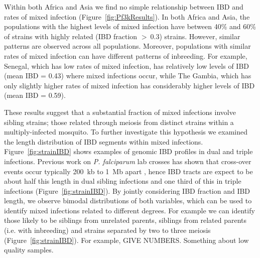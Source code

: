 \documentclass[9pt,lineno]{elife}
\begin{document}
Within both Africa and Asia we find no simple relationship between IBD and rates of mixed infection (Figure~\ref{fig:Pf3kResults}).  In both Africa and Asia, the populations with the highest levels of mixed infection have between 40\% and 60\% of strains with highly related (IBD fraction $>~0.3$) strains.  However, similar patterns are observed across all populations.  Moreover, populations with similar rates of mixed infection can have different patterns of inbreeding.  For example, Senegal, which has low rates of mixed infection, has relatively low levels of IBD (mean IBD = 0.43) where mixed infections occur, while The Gambia, which has only slightly higher rates of mixed infection has considerably higher levels of IBD (mean IBD = 0.59).

These results suggest that a substantial fraction of mixed infections involve sibling strains; those related through meiosis from distinct strains within a multiply-infected mosquito.  To further investigate this hypothesis we examined the length distribution of IBD segments within mixed infections.  Figure~\ref{fig:strainIBD} shows examples of genomic IBD profiles in dual and triple infections.  Previous work on {\it P. falciparum} lab crosses has shown that cross-over events occur typically 200~kb to 1~Mb apart \citet{Miles2016}, hence IBD tracts are expect to be about half this length in dual sibling infections and one third of this in triple infections (Figure~\ref{fig:strainIBD}).  By jointly considering IBD fraction and IBD length, we observe bimodal distributions of both variables, which can be used to identify mixed infections related to different degrees.  For example we can identify those likely to be siblings from unrelated parents, siblings from related parents (i.e. with inbreeding) and strains separated by two to three meiosis (Figure~\ref{fig:strainIBD}).  For example, GIVE NUMBERS. Something about low quality samples.
\end{document}

